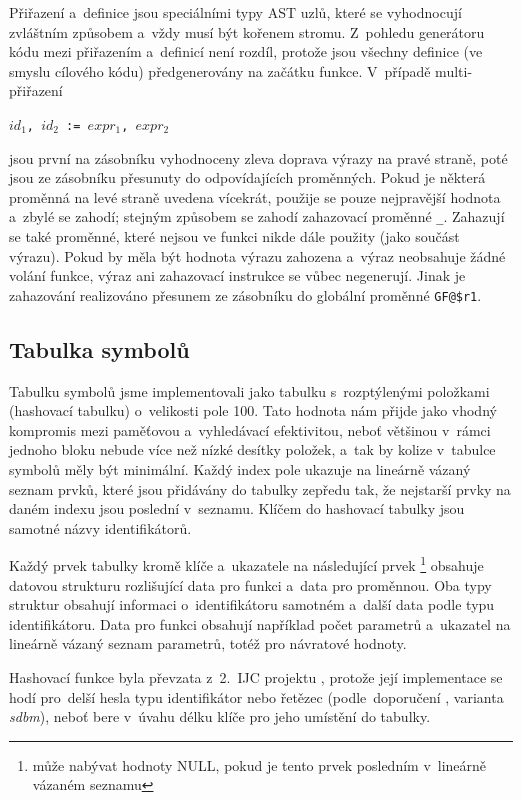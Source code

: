 \documentclass[11pt]{article}
\begin{document}
Přiřazení a~definice jsou speciálními typy AST uzlů, které se vyhodnocují zvláštním způsobem a~vždy musí být kořenem stromu. Z~pohledu generátoru kódu mezi přiřazením a~definicí není rozdíl, protože jsou všechny definice (ve smyslu cílového kódu) předgenerovány na začátku funkce. V~případě multi-přiřazení
\begin{center}
\texttt{$id_1$,\,$id_2$\,:=\,$expr_1$,\,$expr_2$}
\end{center}
jsou první na zásobníku vyhodnoceny zleva doprava výrazy na pravé straně, poté jsou ze zásobníku přesunuty do odpovídajících proměnných. Pokud je některá proměnná na levé straně uvedena vícekrát, použije se pouze nejpravější hodnota a~zbylé se zahodí; stejným způsobem se zahodí zahazovací proměnné \texttt{\_}. Zahazují se také proměnné, které nejsou ve funkci nikde dále použity (jako součást výrazu). Pokud by měla být hodnota výrazu zahozena a~výraz neobsahuje žádné volání funkce, výraz ani zahazovací instrukce se vůbec negenerují. Jinak je zahazování realizováno přesunem ze zásobníku do globální proměnné \texttt{GF@\$r1}.

\subsection{Tabulka symbolů}
Tabulku symbolů jsme implementovali jako tabulku s~rozptýlenými položkami (hashovací tabulku) o~velikosti pole 100. Tato hodnota nám přijde jako vhodný kompromis mezi paměťovou a~vyhledávací efektivitou, neboť většinou v~rámci jednoho bloku nebude více než nízké desítky položek, a~tak by kolize v~tabulce symbolů měly být minimální. Každý index pole ukazuje na lineárně vázaný seznam prvků, které jsou přidávány do tabulky zepředu tak, že nejstarší prvky na daném indexu jsou poslední v~seznamu. Klíčem do hashovací tabulky jsou samotné názvy identifikátorů.

Každý prvek tabulky kromě klíče a~ukazatele na následující prvek \footnote{může nabývat hodnoty NULL, pokud je tento prvek posledním v~lineárně vázaném seznamu} obsahuje datovou strukturu rozlišující data pro funkci a~data pro proměnnou. Oba typy struktur obsahují informaci o~identifikátoru samotném a~další data podle typu identifikátoru. Data pro funkci obsahují například počet parametrů a~ukazatel na lineárně vázaný seznam parametrů, totéž pro návratové hodnoty.

Hashovací funkce byla převzata z~2.~IJC projektu \cite{IJC2DU}, protože její implementace se hodí pro~delší hesla typu identifikátor nebo řetězec (podle~doporučení \cite{HashFunctions}, varianta \emph{sdbm}), neboť bere v~úvahu délku klíče pro jeho umístění do tabulky.
\end{document}
